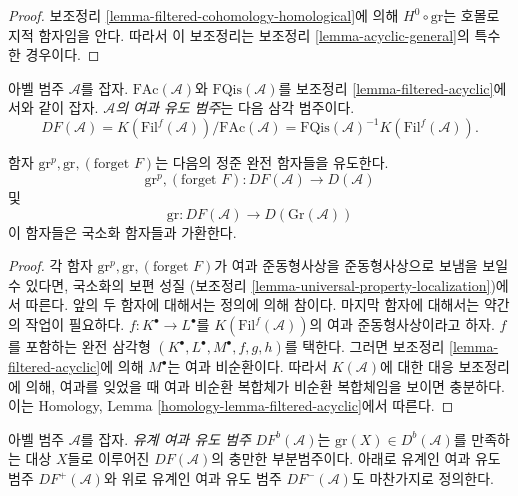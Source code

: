 \begin{proof}
보조정리 \ref{lemma-filtered-cohomology-homological}에 의해
$H^0 \circ \text{gr}$는 호몰로지적 함자임을 안다.
따라서 이 보조정리는 보조정리 \ref{lemma-acyclic-general}의
특수한 경우이다.
\end{proof}

\begin{definition}
\label{definition-filtered-derived}
아벨 범주 $\mathcal{A}$를 잡자. $\text{FAc}(\mathcal{A})$와
$\text{FQis}(\mathcal{A})$를 보조정리
\ref{lemma-filtered-acyclic}에서와 같이 잡자.
{\it $\mathcal{A}$의 여과 유도 범주}는 다음 삼각 범주이다.
$$
DF(\mathcal{A}) =
K(\text{Fil}^f(\mathcal{A}))/\text{FAc}(\mathcal{A}) =
\text{FQis}(\mathcal{A})^{-1} K(\text{Fil}^f(\mathcal{A})).
$$
\end{definition}

\begin{lemma}
\label{lemma-filtered-derived-functors}
함자 $\text{gr}^p, \text{gr}, (\text{forget }F)$는 다음의 정준 완전
함자들을 유도한다.
$$
\text{gr}^p, (\text{forget }F):
DF(\mathcal{A})
\longrightarrow
D(\mathcal{A})
$$
및
$$
\text{gr}:
DF(\mathcal{A})
\longrightarrow
D(\text{Gr}(\mathcal{A}))
$$
이 함자들은 국소화 함자들과 가환한다.
\end{lemma}

\begin{proof}
각 함자 $\text{gr}^p, \text{gr}, (\text{forget }F)$가 여과
준동형사상을 준동형사상으로 보냄을 보일 수 있다면, 국소화의 보편 성질
(보조정리 \ref{lemma-universal-property-localization})에서 따른다.
앞의 두 함자에 대해서는 정의에 의해 참이다. 마지막 함자에 대해서는
약간의 작업이 필요하다. $f : K^\bullet \to L^\bullet$를
$K(\text{Fil}^f(\mathcal{A}))$의 여과 준동형사상이라고 하자.
$f$를 포함하는 완전 삼각형
$(K^\bullet, L^\bullet, M^\bullet, f, g, h)$를 택한다.
그러면 보조정리 \ref{lemma-filtered-acyclic}에 의해 $M^\bullet$는
여과 비순환이다. 따라서 $K(\mathcal{A})$에 대한 대응 보조정리에 의해,
여과를 잊었을 때 여과 비순환 복합체가 비순환 복합체임을 보이면 충분하다.
이는 Homology, Lemma \ref{homology-lemma-filtered-acyclic}에서 따른다.
\end{proof}

\begin{definition}
\label{definition-filtered-derived-bounded}
아벨 범주 $\mathcal{A}$를 잡자. {\it 유계 여과 유도 범주}
$DF^b(\mathcal{A})$는 $\text{gr}(X) \in D^b(\mathcal{A})$를 만족하는
대상 $X$들로 이루어진 $DF(\mathcal{A})$의 충만한 부분범주이다.
아래로 유계인 여과 유도 범주 $DF^{+}(\mathcal{A})$와 위로 유계인
여과 유도 범주 $DF^{-}(\mathcal{A})$도 마찬가지로 정의한다.
\end{definition}

